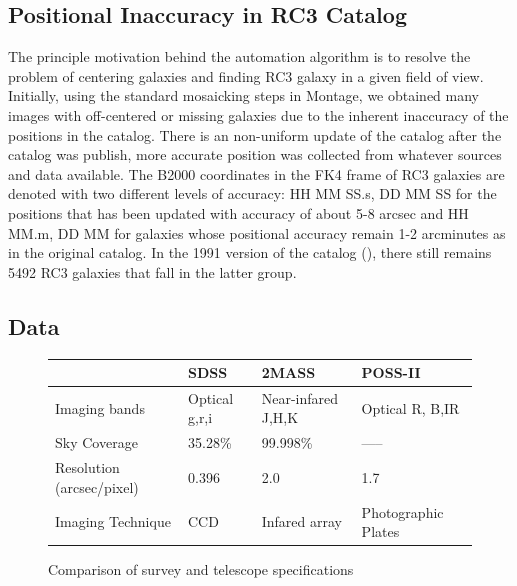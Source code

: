 \documentclass[5p]{elsarticle}
\begin{document}
\subsection{Positional Inaccuracy in RC3 Catalog}
	\label{sec:position}
	The principle motivation behind the automation algorithm is to resolve the problem of centering galaxies and finding RC3 galaxy in a given field of view. Initially, using the standard mosaicking steps in Montage, we obtained many images with  off-centered or missing galaxies due to the inherent inaccuracy of the positions in the catalog. 
There is an non-uniform update of the catalog after the catalog was publish, more accurate position was collected from whatever sources and data available. The B2000 coordinates in the FK4 frame of  RC3 galaxies are denoted with two different levels of accuracy: HH MM SS.s, DD MM SS for the positions that has been updated  with accuracy of about 5-8 arcsec and  HH MM.m, DD MM for galaxies whose positional accuracy remain  1-2 arcminutes as in the original catalog.  In the 1991 version of the catalog (\citet{rc31991}), there still remains 5492 RC3 galaxies that fall in the latter group.
\subsection{Data}
\begin{figure}[!hbt]
\center
    \begin{tabular}{|l|l|l|l|}
    \hline
    ~                         & SDSS          & 2MASS              & POSS-II             \\ \hline
    Imaging bands             & Optical g,r,i & Near-infared J,H,K & Optical R, B,IR     \\ \hline
    Sky Coverage              & 35.28\%       & 99.998\%           & -----               \\ \hline
    Resolution (arcsec/pixel) & 0.396         & 2.0                & 1.7                 \\ \hline
    Imaging Technique         & CCD           & Infared array      & Photographic Plates \\ \hline
    
    \end{tabular}
    \label{table:comptbl}
\caption{Comparison of survey and telescope specifications }
\end{figure}
\end{document}
